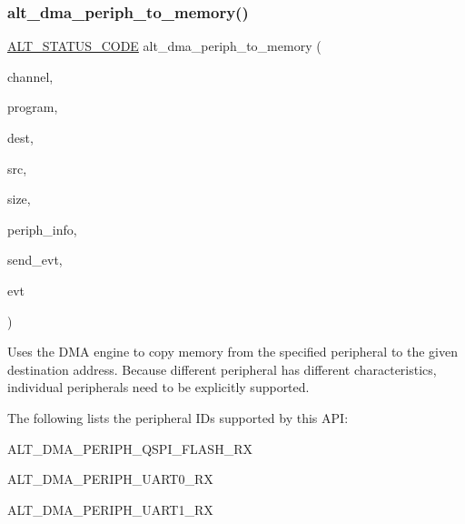\subsubsection{\texorpdfstring{alt\_dma\_periph\_to\_memory()}{alt\_dma\_periph\_to\_memory()}}
{\footnotesize\ttfamily \mbox{\hyperlink{hwlib_8h_abdb0d369f069723ca55d6c94bcaaaa12}{A\+L\+T\+\_\+\+S\+T\+A\+T\+U\+S\+\_\+\+C\+O\+DE}} alt\+\_\+dma\+\_\+periph\+\_\+to\+\_\+memory (\begin{DoxyParamCaption}\item[{\mbox{\hyperlink{group__ALT__DMA__COMMON_ga959232e3b00ce45a3049183cce4c9d59}{A\+L\+T\+\_\+\+D\+M\+A\+\_\+\+C\+H\+A\+N\+N\+E\+L\+\_\+t}}}]{channel,  }\item[{\mbox{\hyperlink{group__ALT__DMA__PRG_gadb7028531574894854db4db6d797de97}{A\+L\+T\+\_\+\+D\+M\+A\+\_\+\+P\+R\+O\+G\+R\+A\+M\+\_\+t}} $\ast$}]{program,  }\item[{void $\ast$}]{dest,  }\item[{\mbox{\hyperlink{group__ALT__DMA__COMMON_gae9baf8ac891f0583f9c1c61528cc1736}{A\+L\+T\+\_\+\+D\+M\+A\+\_\+\+P\+E\+R\+I\+P\+H\+\_\+t}}}]{src,  }\item[{size\+\_\+t}]{size,  }\item[{void $\ast$}]{periph\+\_\+info,  }\item[{bool}]{send\+\_\+evt,  }\item[{\mbox{\hyperlink{group__ALT__DMA__COMMON_gad02f1735ad41b201414e8d032e0f9426}{A\+L\+T\+\_\+\+D\+M\+A\+\_\+\+E\+V\+E\+N\+T\+\_\+t}}}]{evt }\end{DoxyParamCaption})}

Uses the D\+MA engine to copy memory from the specified peripheral to the given destination address. Because different peripheral has different characteristics, individual peripherals need to be explicitly supported.

The following lists the peripheral I\+Ds supported by this A\+PI\+:
\begin{DoxyItemize}
\item A\+L\+T\+\_\+\+D\+M\+A\+\_\+\+P\+E\+R\+I\+P\+H\+\_\+\+Q\+S\+P\+I\+\_\+\+F\+L\+A\+S\+H\+\_\+\+RX
\item A\+L\+T\+\_\+\+D\+M\+A\+\_\+\+P\+E\+R\+I\+P\+H\+\_\+\+U\+A\+R\+T0\+\_\+\+RX
\item A\+L\+T\+\_\+\+D\+M\+A\+\_\+\+P\+E\+R\+I\+P\+H\+\_\+\+U\+A\+R\+T1\+\_\+\+RX
\end{DoxyItemize}


